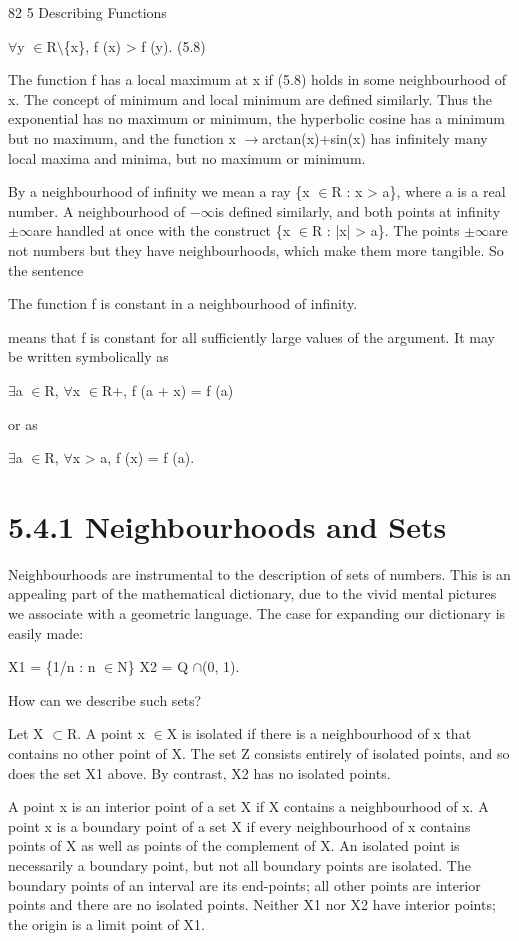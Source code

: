 \documentclass[11pt]{article}
\theoremstyle{plain}
\theoremstyle{definition}
\begin{document}
82 5 Describing Functions

$\forall$y $\in$R$\setminus$\{x\}, f (x) > f (y). (5.8)

The function f has a local maximum at x if (5.8) holds in some neighbourhood of x. The concept of minimum and local minimum are defined similarly. Thus the exponential has no maximum or minimum, the hyperbolic cosine has a minimum but no maximum, and the function x $\to$arctan(x)+sin(x) has infinitely many local maxima and minima, but no maximum or minimum.

By a neighbourhood of infinity we mean a ray \{x $\in$R : x > a\}, where a is a real number. A neighbourhood of $-$$\infty$is defined similarly, and both points at infinity $\pm$$\infty$are handled at once with the construct \{x $\in$R : |x| > a\}. The points $\pm$$\infty$are not numbers but they have neighbourhoods, which make them more tangible. So the sentence

The function f is constant in a neighbourhood of infinity.

means that f is constant for all sufficiently large values of the argument. It may be written symbolically as

$\exists$a $\in$R, $\forall$x $\in$R+, f (a + x) = f (a)

or as

$\exists$a $\in$R, $\forall$x > a, f (x) = f (a).

\section{5.4.1 Neighbourhoods and Sets}

Neighbourhoods are instrumental to the description of sets of numbers. This is an appealing part of the mathematical dictionary, due to the vivid mental pictures we associate with a geometric language. The case for expanding our dictionary is easily made:

X1 = \{1/n : n $\in$N\} X2 = Q $\cap$(0, 1).

How can we describe such sets?

Let X $\subset$R. A point x $\in$X is isolated if there is a neighbourhood of x that contains no other point of X. The set Z consists entirely of isolated points, and so does the set X1 above. By contrast, X2 has no isolated points.

A point x is an interior point of a set X if X contains a neighbourhood of x. A point x is a boundary point of a set X if every neighbourhood of x contains points of X as well as points of the complement of X. An isolated point is necessarily a boundary point, but not all boundary points are isolated. The boundary points of an interval are its end-points; all other points are interior points and there are no isolated points. Neither X1 nor X2 have interior points; the origin is a limit point of X1.
\end{document}
